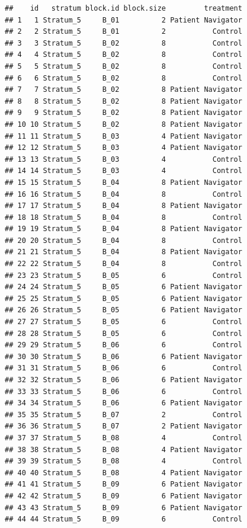 \documentclass[
]{book}
\begin{document}
\begin{verbatim}
##    id   stratum block.id block.size         treatment
## 1   1 Stratum_5     B_01          2 Patient Navigator
## 2   2 Stratum_5     B_01          2           Control
## 3   3 Stratum_5     B_02          8           Control
## 4   4 Stratum_5     B_02          8           Control
## 5   5 Stratum_5     B_02          8           Control
## 6   6 Stratum_5     B_02          8           Control
## 7   7 Stratum_5     B_02          8 Patient Navigator
## 8   8 Stratum_5     B_02          8 Patient Navigator
## 9   9 Stratum_5     B_02          8 Patient Navigator
## 10 10 Stratum_5     B_02          8 Patient Navigator
## 11 11 Stratum_5     B_03          4 Patient Navigator
## 12 12 Stratum_5     B_03          4 Patient Navigator
## 13 13 Stratum_5     B_03          4           Control
## 14 14 Stratum_5     B_03          4           Control
## 15 15 Stratum_5     B_04          8 Patient Navigator
## 16 16 Stratum_5     B_04          8           Control
## 17 17 Stratum_5     B_04          8 Patient Navigator
## 18 18 Stratum_5     B_04          8           Control
## 19 19 Stratum_5     B_04          8 Patient Navigator
## 20 20 Stratum_5     B_04          8           Control
## 21 21 Stratum_5     B_04          8 Patient Navigator
## 22 22 Stratum_5     B_04          8           Control
## 23 23 Stratum_5     B_05          6           Control
## 24 24 Stratum_5     B_05          6 Patient Navigator
## 25 25 Stratum_5     B_05          6 Patient Navigator
## 26 26 Stratum_5     B_05          6 Patient Navigator
## 27 27 Stratum_5     B_05          6           Control
## 28 28 Stratum_5     B_05          6           Control
## 29 29 Stratum_5     B_06          6           Control
## 30 30 Stratum_5     B_06          6 Patient Navigator
## 31 31 Stratum_5     B_06          6           Control
## 32 32 Stratum_5     B_06          6 Patient Navigator
## 33 33 Stratum_5     B_06          6           Control
## 34 34 Stratum_5     B_06          6 Patient Navigator
## 35 35 Stratum_5     B_07          2           Control
## 36 36 Stratum_5     B_07          2 Patient Navigator
## 37 37 Stratum_5     B_08          4           Control
## 38 38 Stratum_5     B_08          4 Patient Navigator
## 39 39 Stratum_5     B_08          4           Control
## 40 40 Stratum_5     B_08          4 Patient Navigator
## 41 41 Stratum_5     B_09          6 Patient Navigator
## 42 42 Stratum_5     B_09          6 Patient Navigator
## 43 43 Stratum_5     B_09          6 Patient Navigator
## 44 44 Stratum_5     B_09          6           Control

\end{verbatim}
\end{document}
